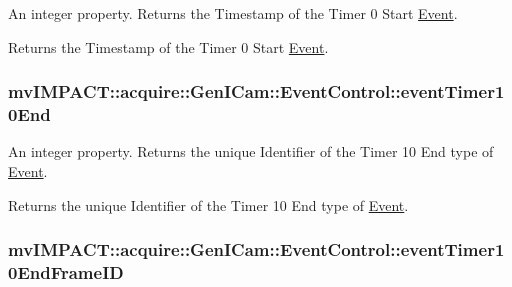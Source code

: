 An integer property. Returns the Timestamp of the Timer 0 Start \hyperlink{classmv_i_m_p_a_c_t_1_1acquire_1_1_event}{Event}. 

Returns the Timestamp of the Timer 0 Start \hyperlink{classmv_i_m_p_a_c_t_1_1acquire_1_1_event}{Event}. \hypertarget{classmv_i_m_p_a_c_t_1_1acquire_1_1_gen_i_cam_1_1_event_control_a9748c5e2c5139c4387000397a7bb7619}{
\subsubsection[{event\+Timer10\+End}]{ mv\+I\+M\+P\+A\+C\+T\+::acquire\+::\+Gen\+I\+Cam\+::\+Event\+Control\+::event\+Timer10\+End}}\label{classmv_i_m_p_a_c_t_1_1acquire_1_1_gen_i_cam_1_1_event_control_a9748c5e2c5139c4387000397a7bb7619}


An integer property. Returns the unique Identifier of the Timer 10 End type of \hyperlink{classmv_i_m_p_a_c_t_1_1acquire_1_1_event}{Event}. 

Returns the unique Identifier of the Timer 10 End type of \hyperlink{classmv_i_m_p_a_c_t_1_1acquire_1_1_event}{Event}. \hypertarget{classmv_i_m_p_a_c_t_1_1acquire_1_1_gen_i_cam_1_1_event_control_a18ec12b028fb9e5f7ec2505d1ee53ea8}{
\subsubsection[{event\+Timer10\+End\+Frame\+I\+D}]{ mv\+I\+M\+P\+A\+C\+T\+::acquire\+::\+Gen\+I\+Cam\+::\+Event\+Control\+::event\+Timer10\+End\+Frame\+I\+D}}\label{classmv_i_m_p_a_c_t_1_1acquire_1_1_gen_i_cam_1_1_event_control_a18ec12b028fb9e5f7ec2505d1ee53ea8}



